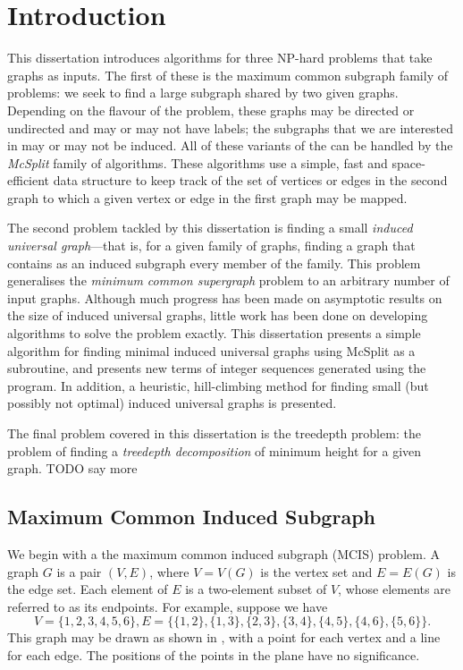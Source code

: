\chapter{Introduction}
\label{c:intro}

This dissertation introduces algorithms for three NP-hard problems that
take graphs as inputs.  The first of these is the maximum common subgraph
family of problems: we seek to find a large subgraph shared by two given graphs.
Depending on the flavour of the problem, these
graphs may be directed or undirected and may or may not have labels; the
subgraphs that we are interested in may or may not be induced.  All of these
variants of the can be handled by the \textit{McSplit} family of algorithms.
These algorithms use a simple, fast and space-efficient data structure to keep
track of the set of vertices or edges in the second graph to which a given vertex
or edge in the first graph may be mapped.

The second problem tackled by this dissertation is finding a small \textit{induced
universal graph}---that is, for a given family of graphs, finding a graph that contains as
an induced subgraph every member of the family.  This problem generalises
the \textit{minimum common supergraph} problem to an arbitrary number of input
graphs.  Although much progress has been made on asymptotic results on the size
of induced universal graphs, little work has been done on developing algorithms
to solve the problem exactly.
This dissertation presents a simple algorithm for finding minimal induced
universal graphs using McSplit as a subroutine, and presents new terms of
integer sequences generated using the program.  In addition, a heuristic, hill-climbing
method for finding small (but possibly not optimal) induced universal graphs is
presented.

The final problem covered in this dissertation is the treedepth problem: the
problem of finding a \textit{treedepth decomposition} of minimum height for a given
graph.  TODO say more

\section{Maximum Common Induced Subgraph}

We begin with a the maximum common induced subgraph (MCIS) problem. A
graph $G$ is a pair $(V, E)$, where $V = V(G)$ is the vertex set and $E = E(G)$
is the edge set. Each element of $E$ is a two-element subset of $V$, whose
elements are referred to as its endpoints. For example, suppose we have
\[
V = \{1, 2, 3, 4, 5, 6\},
E = \{\{1,2\}, \{1,3\}, \{2,3\}, \{3,4\}, \{4,5\}, \{4,6\}, \{5,6\}\}
.
\]
This graph may be drawn as shown in , with a point for each
vertex and a line for each edge.  The positions of the points in the plane have
no significance.

